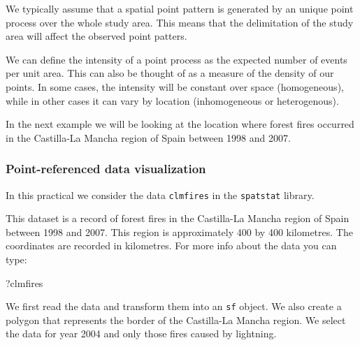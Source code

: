 \documentclass[
  letterpaper,
  DIV=11,
  numbers=noendperiod]{scrartcl}
\newenvironment{Shaded}{\begin{snugshade}}{\end{snugshade}}
\newcommand{\NormalTok}[1]{\textcolor[rgb]{0.00,0.23,0.31}{#1}}
\begin{document}
We typically assume that a spatial point pattern is generated by an
unique point process over the whole study area. This means that the
delimitation of the study area will affect the observed point patters.

We can define the intensity of a point process as the expected number of
events per unit area. This can also be thought of as a measure of the
density of our points. In some cases, the intensity will be constant
over space (homogeneous), while in other cases it can vary by location
(inhomogeneous or heterogenous).

In the next example we will be looking at the location where forest
fires occurred in the Castilla-La Mancha region of Spain between 1998
and 2007.

\subsubsection{Point-referenced data
visualization}\label{point-referenced-data-visualization}

In this practical we consider the data \texttt{clmfires} in the
\texttt{spatstat} library.

This dataset is a record of forest fires in the Castilla-La Mancha
region of Spain between 1998 and 2007. This region is approximately 400
by 400 kilometres. The coordinates are recorded in kilometres. For more
info about the data you can type:

\begin{Shaded}
\begin{Highlighting}[]
\NormalTok{?clmfires}
\end{Highlighting}
\end{Shaded}

We first read the data and transform them into an \texttt{sf} object. We
also create a polygon that represents the border of the Castilla-La
Mancha region. We select the data for year 2004 and only those fires
caused by lightning.
\end{document}
